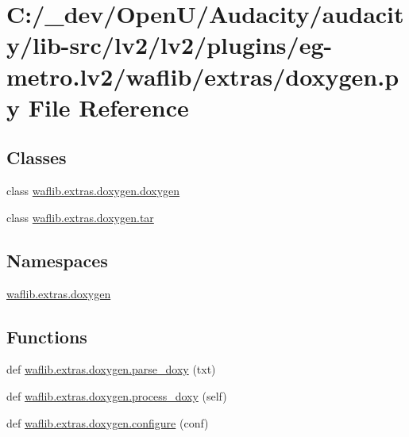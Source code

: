 \hypertarget{lv2_2plugins_2eg-metro_8lv2_2waflib_2extras_2doxygen_8py}{}\section{C\+:/\+\_\+dev/\+Open\+U/\+Audacity/audacity/lib-\/src/lv2/lv2/plugins/eg-\/metro.lv2/waflib/extras/doxygen.py File Reference}
\label{lv2_2plugins_2eg-metro_8lv2_2waflib_2extras_2doxygen_8py}
\subsection*{Classes}
\begin{DoxyCompactItemize}
\item 
class \hyperlink{classwaflib_1_1extras_1_1doxygen_1_1doxygen}{waflib.\+extras.\+doxygen.\+doxygen}
\item 
class \hyperlink{classwaflib_1_1extras_1_1doxygen_1_1tar}{waflib.\+extras.\+doxygen.\+tar}
\end{DoxyCompactItemize}
\subsection*{Namespaces}
\begin{DoxyCompactItemize}
\item 
 \hyperlink{namespacewaflib_1_1extras_1_1doxygen}{waflib.\+extras.\+doxygen}
\end{DoxyCompactItemize}
\subsection*{Functions}
\begin{DoxyCompactItemize}
\item 
def \hyperlink{namespacewaflib_1_1extras_1_1doxygen_ad00d728a0949db6dd441165547e07e7a}{waflib.\+extras.\+doxygen.\+parse\+\_\+doxy} (txt)
\item 
def \hyperlink{namespacewaflib_1_1extras_1_1doxygen_a88b85c6ce6a068c606c3e035e84d8760}{waflib.\+extras.\+doxygen.\+process\+\_\+doxy} (self)
\item 
def \hyperlink{namespacewaflib_1_1extras_1_1doxygen_a172fdeb5aa82f9d3d452b22a5f4abe70}{waflib.\+extras.\+doxygen.\+configure} (conf)
\end{DoxyCompactItemize}
